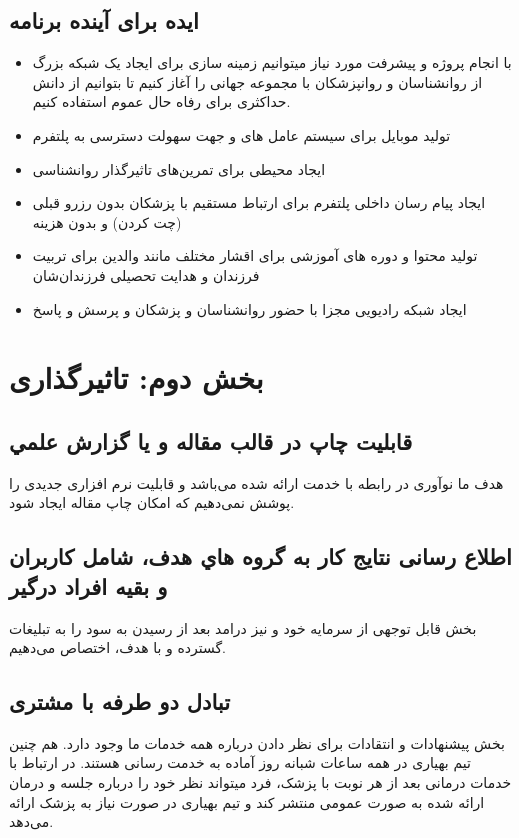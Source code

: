 \documentclass[a4paper]{article}
\begin{document}
		\subsection{ایده برای آینده برنامه}
		
		\begin{itemize}
			\item با انجام پروژه و پیشرفت مورد نیاز میتوانیم زمینه سازی برای ایجاد یک شبکه بزرگ از روانشناسان و روانپزشکان با مجموعه جهانی را آغاز کنیم تا بتوانیم از دانش حداکثری برای رفاه حال عموم استفاده کنیم.
			
			\item تولید  موبایل برای سیستم عامل های  و  جهت سهولت دسترسی به پلتفرم
				
			\item ایجاد محیطی برای تمرین‌های تاثیرگذار روانشناسی
			
			\item ایجاد پیام رسان داخلی پلتفرم برای ارتباط مستقیم با پزشکان بدون رزرو قبلی (چت کردن) و بدون هزینه
			
			\item تولید محتوا و دوره های آموزشی برای اقشار مختلف مانند والدین برای تربیت فرزندان و هدایت تحصیلی فرزندان‌شان
			
			\item ایجاد شبکه رادیویی مجزا با حضور روانشناسان و پزشکان و پرسش و پاسخ
			
		\end{itemize}
		
		\section{بخش دوم: تاثیرگذاری}
		\subsection{قابلیت چاپ در قالب مقاله و يا گزارش علمي}
		هدف ما نوآوری در رابطه با خدمت ارائه شده می‌باشد و قابلیت نرم افزاری جدیدی را پوشش نمی‌دهیم که امکان چاپ مقاله ایجاد شود.
		
		\subsection{اطلاع رسانی نتايج كار به گروه هاي هدف، شامل كاربران و بقيه افراد درگير}
		بخش قابل توجهی از سرمایه خود و نیز درامد بعد از رسیدن به سود را به تبلیغات گسترده و با هدف، اختصاص می‌دهیم.
		
		\subsection{تبادل دو طرفه با مشتری}
		بخش پیشنهادات و انتقادات برای نظر دادن درباره همه خدمات ما وجود دارد. هم چنین تیم بهیاری در همه ساعات شبانه روز آماده به خدمت رسانی هستند. در ارتباط با خدمات درمانی بعد از هر نوبت با پزشک، فرد میتواند نظر خود را درباره جلسه و درمان ارائه شده به صورت عمومی منتشر کند و تیم بهیاری در صورت نیاز به پزشک ارائه می‌دهد.
		
\end{document}

